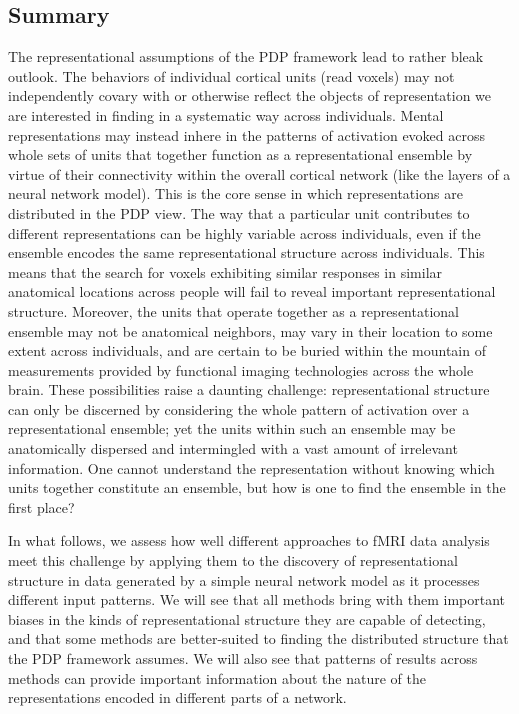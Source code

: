 \subsection{Summary}
The representational assumptions of the PDP framework lead to rather bleak outlook. The behaviors of individual cortical units (read voxels) may not independently covary with or otherwise reflect the objects of representation we are interested in finding in a systematic way across individuals. Mental representations may instead inhere in the patterns of activation evoked across whole sets of units that together function as a representational ensemble by virtue of their connectivity within the overall cortical network (like the layers of a neural network model). This is the core sense in which representations are distributed in the PDP view. The way that a particular unit contributes to different representations can be highly variable across individuals, even if the ensemble encodes the same representational structure across individuals. This means that the search for voxels exhibiting similar responses in similar anatomical locations across people will fail to reveal important representational structure. Moreover, the units that operate together as a representational ensemble may not be anatomical neighbors, may vary in their location to some extent across individuals, and are certain to be buried within the mountain of measurements provided by functional imaging technologies across the whole brain. These possibilities raise a daunting challenge: representational structure can only be discerned by considering the whole pattern of activation over a representational ensemble; yet the units within such an ensemble may be anatomically dispersed and intermingled with a vast amount of irrelevant information. One cannot understand the representation without knowing which units together constitute an ensemble, but how is one to find the ensemble in the first place?

In what follows, we assess how well different approaches to fMRI data analysis meet this challenge by applying them to the discovery of representational structure in data generated by a simple neural network model as it processes different input patterns. We will see that all methods bring with them important biases in the kinds of representational structure they are capable of detecting, and that some methods are better-suited to finding the distributed structure that the PDP framework assumes. We will also see that patterns of results across methods can provide important information about the nature of the representations encoded in different parts of a network.

